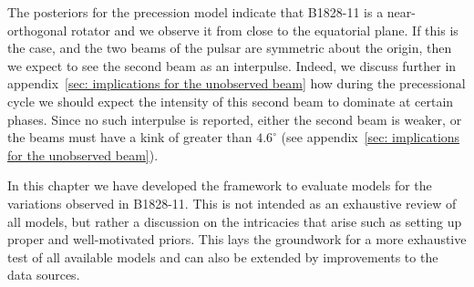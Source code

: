 \documentclass[../full_thesis/full_thesis.tex]{subfiles}
\newcommand{\degr}{^{\circ}}
\begin{document}
The posteriors for the precession model indicate that B1828-11 is a
near-orthogonal rotator and we observe it from close to the equatorial plane.
If this is the case, and the two beams of the pulsar are symmetric about the
origin, then we expect to see the second beam as an interpulse. Indeed, we
discuss further in appendix~\ref{sec: implications for the unobserved beam} how
during the precessional cycle we should expect the intensity of this second
beam to dominate at certain phases. Since no such interpulse is reported,
either the second beam is weaker, or the beams must have a kink of greater than
$4.6\degr$ (see appendix~\ref{sec: implications for the unobserved beam}).

In this chapter we have developed the framework to evaluate models for the
variations observed in B1828-11. This is not intended as an exhaustive review
of all models, but rather a discussion on the intricacies that arise such as
setting up proper and well-motivated priors. This lays the groundwork
for a more exhaustive test of all available models and can also be extended
by improvements to the data sources.

\biblio
\end{document}
